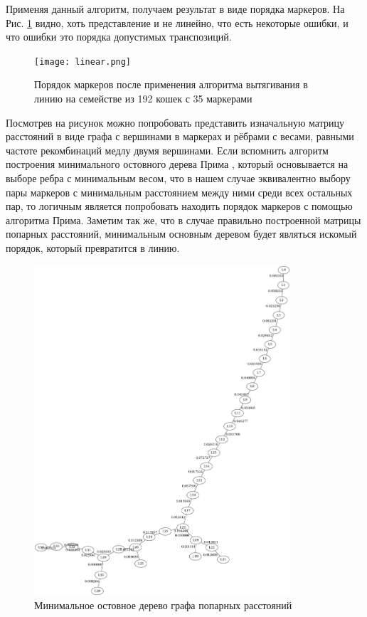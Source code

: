 \documentclass{matmex-diploma-custom}
\begin{document}
Применяя данный алгоритм, получаем результат в виде порядка маркеров.
На Рис. \ref{fig:fig3} видно, хоть представление и не линейно, что
есть некоторые ошибки, и что ошибки это порядка допустимых
транспозиций.
\begin{figure}[h]
 \centering
  \texttt{[image: linear.png]}
  \caption[width=0.8\textwidth]{Порядок маркеров после применения
    алгоритма вытягивания в линию на семействе из 192 кошек с 35 маркерами}
  \label{fig:fig3}
\end{figure}
Посмотрев на рисунок можно попробовать представить изначальную матрицу
расстояний в виде графа с вершинами в маркерах и рёбрами с весами,
равными частоте рекомбинаций медлу двумя вершинами. Если вспомнить
алгоритм построения минимального остовного дерева Прима
\cite{cormen2001introduction}, который основывается на выборе ребра с
минимальным весом, что в нашем случае эквивалентно выбору пары
маркеров с минимальным расстоянием между ними среди всех остальных
пар, то логичным является попробовать находить порядок маркеров с
помощью алгоритма Прима. Заметим так же, что в случае правильно
построенной матрицы попарных расстояний, минимальным основным деревом
будет являться искомый порядок, который превратится в линию.
\begin{figure}[h]
  \centering
  \includegraphics[width=0.85\textwidth]{prm.png}
  \caption[width=0.8\textwidth]{Минимальное остовное дерево графа
    попарных расстояний}
  \label{fig:fig4}
\end{figure}
\end{document}
